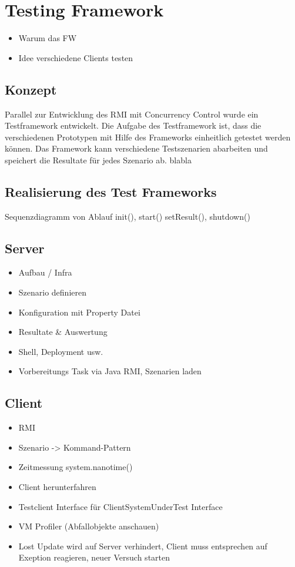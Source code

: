 \section{Testing Framework}
\label{sec:testing Framework}
\begin{itemize}
\item Warum das FW
\item Idee verschiedene Clients testen
\end{itemize}

\subsection{Konzept}
Parallel zur Entwicklung des RMI mit Concurrency Control wurde ein Testframework entwickelt. Die Aufgabe des Testframework ist, dass die verschiedenen Prototypen mit Hilfe des Frameworks einheitlich getestet werden können. Das Framework kann verschiedene Testszenarien abarbeiten und speichert die Resultate für jedes Szenario ab. blabla


\subsection{Realisierung des Test Frameworks}
\label{sec:real test-FW}
Sequenzdiagramm von Ablauf init(), start() setResult(), shutdown()

\subsection{Server}
\label{sec:test-FW Server}

\begin{itemize}
\item Aufbau / Infra
\item Szenario definieren
\item Konfiguration mit Property Datei
\item Resultate \& Auswertung
\item Shell, Deployment usw.
\item Vorbereitungs Task via Java RMI, Szenarien laden
\end{itemize}

\subsection{Client}
\label{sec:test-FW Client}

\begin{itemize}
\item RMI
\item Szenario -> Kommand-Pattern
\item Zeitmessung system.nanotime()
\item Client herunterfahren
\item Testclient Interface für ClientSystemUnderTest Interface
\item VM Profiler (Abfallobjekte anschauen)
\item Lost Update wird auf Server verhindert, Client muss entsprechen auf Exeption reagieren, neuer Versuch starten
\end{itemize}